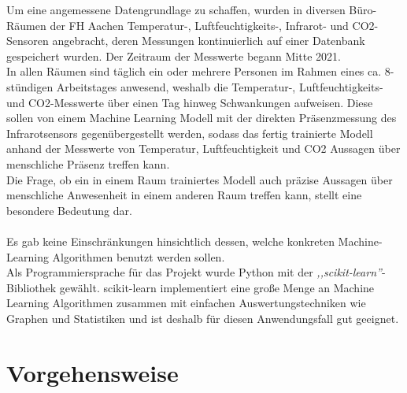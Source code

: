 Um eine angemessene Datengrundlage zu schaffen, wurden in diversen Büro-Räumen der FH Aachen Temperatur-,
Luftfeuchtigkeits-, Infrarot- und CO2-Sensoren angebracht, deren Messungen kontinuierlich auf einer Datenbank
gespeichert wurden. Der Zeitraum der Messwerte begann Mitte 2021.\\
In allen Räumen sind täglich ein oder mehrere
Personen im Rahmen eines ca. 8-stündigen Arbeitstages anwesend, weshalb die Temperatur-, Luftfeuchtigkeits-
und CO2-Messwerte über einen Tag hinweg Schwankungen aufweisen. Diese sollen von einem Machine Learning Modell
mit der direkten Präsenzmessung des Infrarotsensors gegenübergestellt werden, sodass das fertig trainierte Modell
anhand der Messwerte von Temperatur, Luftfeuchtigkeit und CO2 Aussagen über menschliche Präsenz treffen kann.\\
Die Frage, ob ein in einem Raum trainiertes Modell auch präzise Aussagen über menschliche Anwesenheit in einem anderen Raum
treffen kann, stellt eine besondere Bedeutung dar.\\\\
Es gab keine Einschränkungen hinsichtlich dessen, welche konkreten Machine-Learning Algorithmen 
benutzt werden sollen.\\
Als Programmiersprache für das Projekt wurde Python mit der \textit{,,scikit-learn''}-Bibliothek gewählt. scikit-learn
implementiert eine große Menge an Machine Learning Algorithmen zusammen mit einfachen Auswertungstechniken 
wie Graphen und Statistiken und ist deshalb für diesen Anwendungsfall gut geeignet.






\newpage

\section{Vorgehensweise}


